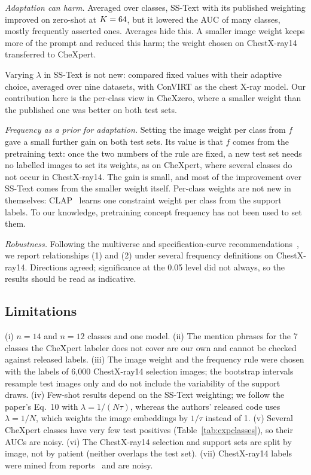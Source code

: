 \documentclass[journal]{IEEEtran}
\begin{document}
\emph{Adaptation can harm.} 
Averaged over classes, SS-Text with its published weighting improved on zero-shot at $K=64$, but it lowered the AUC of many classes, mostly frequently asserted ones. 
Averages hide this. A smaller image weight keeps more of the prompt and reduced this harm; the weight chosen on ChestX-ray14 transferred to CheXpert.

Varying $\lambda$
in SS-Text is not new: \cite{silvarodriguez2025fca} compared fixed values with their adaptive choice,
averaged over nine datasets, with ConVIRT as the chest X-ray model. Our contribution here is the
per-class view in CheXzero, where a smaller weight than the published one was better on both test sets.

\emph{Frequency as a prior for adaptation.} Setting the image weight per class from $f$ gave a small
further gain on both test sets. Its value is that $f$ comes from the pretraining text: once the two
numbers of the rule are fixed, a new test set needs no labelled images to set its weights, as on
CheXpert, where several classes do not occur in ChestX-ray14. The gain is small, and most of the improvement over SS-Text comes from the smaller weight itself.
Per-class weights are not new in themselves: CLAP~\cite{silva2024closer} learns one constraint weight per
class from the support labels. To our knowledge, pretraining concept frequency has not been used to set them.

\emph{Robustness.} Following the multiverse and specification-curve
recommendations~\cite{steegen2016multiverse,simonsohn2020specification}, we report relationships (1)
and (2) under several frequency definitions on ChestX-ray14. Directions agreed; significance at the 0.05
level did not always, so the results should be read as indicative.

\subsection{Limitations}
(i) $n=14$ and $n=12$ classes and one model. (ii) The mention phrases for the 7 classes the CheXpert
labeler does not cover are our own and cannot be checked against released labels. (iii) The image weight
and the frequency rule were chosen with the labels of 6{,}000 ChestX-ray14 selection images; the
bootstrap intervals resample test images only and do not include the variability of the support draws.
(iv) Few-shot results depend on the SS-Text weighting; we follow the paper's Eq.~10 with
$\lambda=1/(N\tau)$, whereas the authors' released code uses $\lambda=1/N$, which weights the image
embeddings by $1/\tau$ instead of 1. (v) Several CheXpert
classes have very few test positives (Table~\ref{tab:cxpclasses}), so their AUCs are noisy. (vi) The
ChestX-ray14 selection and support sets are split by image, not by patient (neither overlaps the test
set). (vii) ChestX-ray14 labels were mined from reports~\cite{wang2017chestxray8} and are noisy.
\end{document}
